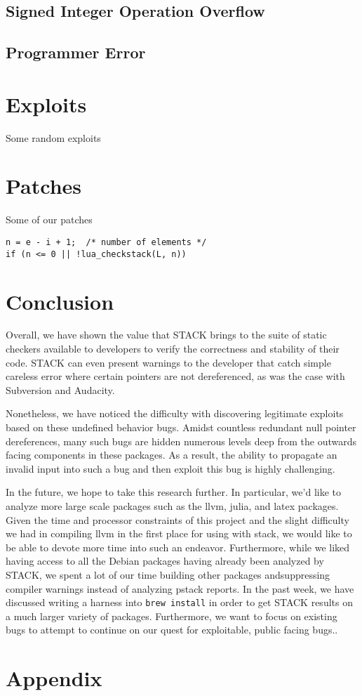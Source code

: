 \documentclass[11pt,twocolumn]{article}
\begin{document}
\subsection{Signed Integer Operation Overflow}

\subsection{Programmer Error}




\section{Exploits}
Some random exploits

\section{Patches}
Some of our patches

\begin{lstlisting}
n = e - i + 1;  /* number of elements */
if (n <= 0 || !lua_checkstack(L, n))
\end{lstlisting}

\section{Conclusion}
\label{sec:conclusion}
Overall, we have shown the value that STACK brings to the suite of static checkers available to 
developers to verify the correctness and stability of their code. STACK can even present warnings
to the developer that catch simple careless error where certain pointers are not dereferenced, as
was the case with Subversion and Audacity. 

Nonetheless, we have noticed the difficulty with discovering legitimate exploits based on these
undefined behavior bugs. Amidst countless redundant null pointer dereferences, many such bugs
are hidden numerous levels deep from the outwards facing components in these packages. As a result,
the ability to propagate an invalid input into such a bug and then exploit this bug is highly challenging. 

In the future, we hope to take this research further. In particular, we'd like to analyze more large
scale packages such as the llvm, julia, and latex packages. Given the time and processor constraints
of this project and the slight difficulty we had in compiling llvm in the first place for using
with stack, we would like to be able to devote more time into such an endeavor. Furthermore, while we liked
having access to all the Debian packages having already been analyzed by STACK, we spent a lot of our time
building other packages andsuppressing compiler warnings instead of analyzing pstack reports. 
In the past week, we have discussed writing a harness into \texttt{brew install} in order to get STACK
results on a much larger variety of packages. Furthermore, we want to focus on existing bugs to attempt
to continue on our quest for exploitable, public facing bugs..



\section{Appendix}
\label{sec:appendix}
\end{document}
